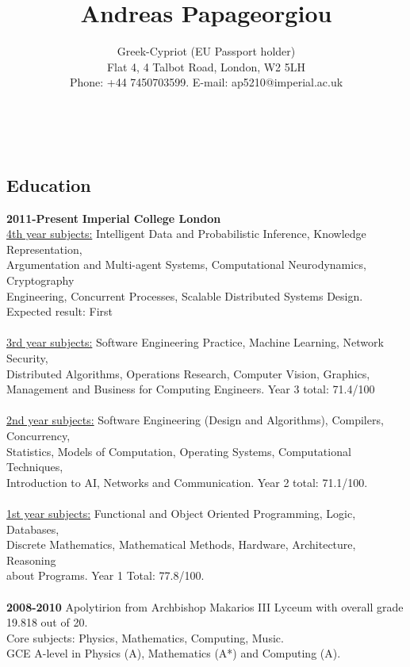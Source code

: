 \documentclass[a4paper,10pt]{article}
\title{\bf Andreas Papageorgiou}
\author{Greek-Cypriot (EU Passport holder)\\Flat 4, 4 Talbot Road, London, W2 5LH\\Phone: +44 7450703599. E-mail: ap5210@imperial.ac.uk}
\date{}
\begin{document}
\maketitle
\ \vspace{-0.2cm}
\subsection*{Education}
\begin{tabbing}
{\bf 2011-Present} \hspace{8pt} \= {\bf Imperial College London} \\
\>\underline{4th year subjects:} Intelligent Data and Probabilistic Inference, Knowledge Representation,\\
\> Argumentation and Multi-agent Systems, Computational Neurodynamics, Cryptography \\
\> Engineering, Concurrent Processes, Scalable Distributed Systems Design. \\ 
\> Expected result: First\\
\\
\>\underline{3rd year subjects:} Software Engineering Practice, Machine Learning, Network Security,\\
\>Distributed Algorithms, Operations Research, Computer Vision, Graphics,\\
\>Management and Business for Computing Engineers. Year 3 total: 71.4/100\\ \\
\>\underline{2nd year subjects:}
Software Engineering (Design and Algorithms), Compilers, Concurrency,\\ 
\>Statistics, Models of Computation, Operating Systems, Computational Techniques,\\
\>Introduction to AI, Networks and Communication. Year 2 total: 71.1/100.\\ \\
\>\underline{1st year subjects:}
Functional and Object Oriented Programming, Logic, Databases,\\
\>Discrete Mathematics, Mathematical Methods, Hardware, Architecture, Reasoning\\
\>about Programs. Year 1 Total: 77.8/100.\\
\\
{\bf 2008-2010} \> Apolytirion from Archbishop Makarios III Lyceum with overall grade 19.818 out of 20.\\
\>Core subjects: Physics, Mathematics, Computing, Music.\\
\>GCE A-level in Physics (A), Mathematics (A*) and Computing (A).
\\
\end{tabbing}
\end{document}
